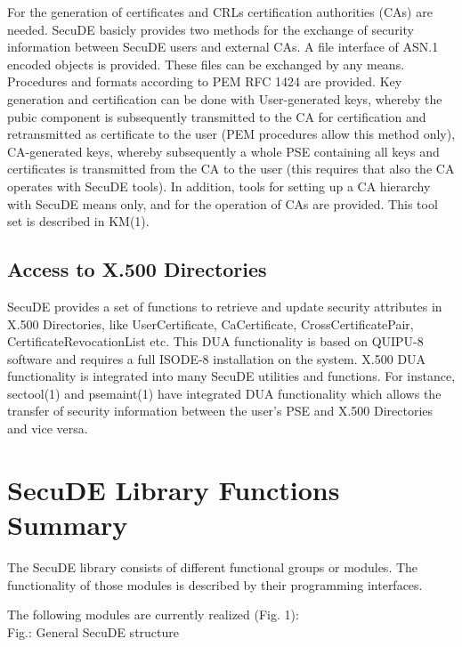 For the generation of certificates and CRLs certification authorities 
(CAs) are needed.
SecuDE basicly provides two methods for the exchange of security
information between SecuDE users and external CAs.
\be
\m A file interface of ASN.1 encoded objects is provided. These
   files can be exchanged by any means.
\m Procedures and formats according to PEM RFC 1424 are provided.
\ee
Key generation and certification can be done with
\be
\m User-generated keys, whereby the pubic component is
   subsequently transmitted to the CA for certification and
   retransmitted as certificate to the user (PEM
   procedures allow this method only),
\m CA-generated keys, whereby subsequently a whole PSE
   containing all keys and certificates is transmitted from
   the CA to the user (this requires that also the CA operates
   with SecuDE tools).
\ee
In addition, tools for setting up a CA hierarchy with SecuDE means 
only, and for the operation of CAs are provided.
This tool set is described in KM(1).

\subsection{Access to X.500 Directories}

SecuDE provides a set of functions to retrieve and update security 
attributes in X.500
Directories, like UserCertificate, CaCertificate, CrossCertificatePair, 
CertificateRevocationList etc. This DUA functionality is based on
QUIPU-8 software and requires a full ISODE-8 installation on the system. 
X.500 DUA functionality is integrated into many SecuDE utilities
and functions. For instance, sectool(1) and psemaint(1) have integrated
DUA functionality
which allows the transfer of security information between the user's
PSE and X.500 Directories and vice versa.

\section{SecuDE Library Functions Summary}
\pagestyle{myheadings}

The SecuDE library consists of different functional groups or modules. The 
functionality of those modules is described by their programming 
interfaces.
 
The following modules are currently realized (Fig. 1):
\\ [0.4cm]


{\footnotesize Fig.:
General SecuDE structure}

